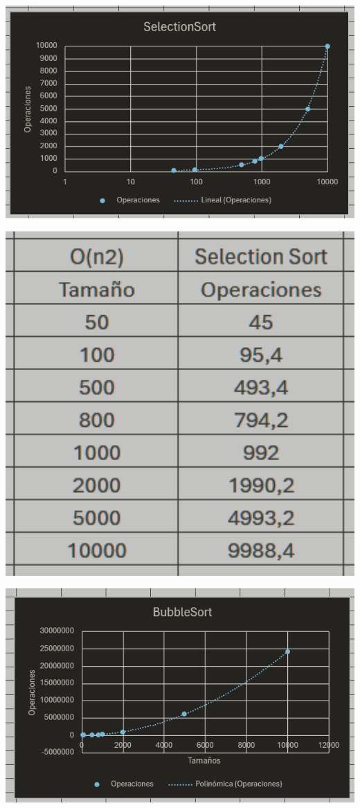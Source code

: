 \documentclass[12pt]{article}
\begin{document}
\includegraphics[width=15cm]{Images/Graf_SS.png}
\par\vspace{0.4cm}
\includegraphics[width=15cm]{Images/Tab_SS.png}
\par\vspace{0.4cm}
\includegraphics[width=15cm]{Images/Graf_BS.png}
\end{document}
